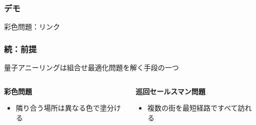 \begin{frame}
  \frametitle{デモ}
  彩色問題：リンク\\
\end{frame}


\begin{frame}
  \frametitle{続：前提}

  {\Large  量子アニーリングは組合せ最適化問題を解く手段の一つ}
  \vspace{5mm}

  \begin{columns}
    \begin{column}{0.45\textwidth}
      \textbf{彩色問題}
      \begin{itemize}
          \item 隣り合う場所は異なる色で塗分ける
      \end{itemize}
    \end{column}

    \begin{column}{0.45\textwidth}
      \textbf{巡回セールスマン問題}
      \begin{itemize}
          \item 複数の街を最短経路ですべて訪れる
      \end{itemize}
    \end{column}
  \end{columns}
  \vspace{10mm}
\end{frame}

